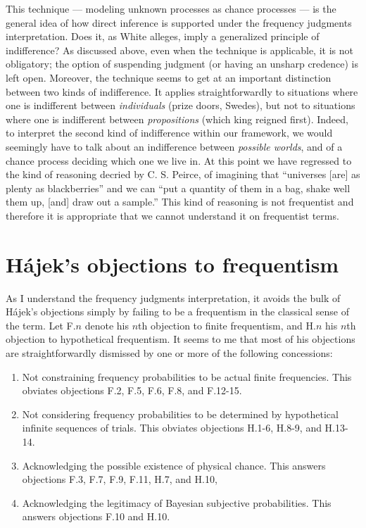 \documentclass[letterpaper,12pt]{article}
\newcommand{\hajek}{H\'ajek}
\begin{document}
This technique --- modeling unknown processes as chance processes --- is the general idea of how direct inference is supported under the frequency judgments interpretation. Does it, as White alleges, imply a generalized principle of indifference? As discussed above, even when the technique is applicable, it is not obligatory; the option of suspending judgment (or having an unsharp credence) is left open. Moreover, the technique seems to get at an important distinction between two kinds of indifference. It applies straightforwardly to situations where one is indifferent between \emph{individuals} (prize doors, Swedes), but not to situations where one is indifferent between \emph{propositions} (which king reigned first). Indeed, to interpret the second kind of indifference within our framework, we would seemingly have to talk about an indifference between \emph{possible worlds}, and of a chance process deciding which one we live in. At this point we have regressed to the kind of reasoning decried by C. S. Peirce, of imagining that ``universes [are] as plenty as blackberries'' and we can ``put a quantity of them in a bag, shake well them up, [and] draw out a sample.'' This kind of reasoning is not frequentist and therefore it is appropriate that we cannot understand it on frequentist terms.

\section{\hajek's objections to frequentism}
As I understand the frequency judgments interpretation, it avoids the bulk of \hajek's objections simply by failing to be a frequentism in the classical sense of the term. Let F.$n$ denote his $n$th objection to finite frequentism, and H.$n$ his $n$th objection to hypothetical frequentism. It seems to me that most of his objections are straightforwardly dismissed by one or more of the following concessions:
\begin{enumerate}
\item
Not constraining frequency probabilities to be actual finite frequencies. This obviates objections F.2, F.5, F.6, F.8, and F.12-15.
\item
Not considering frequency probabilities to be determined by hypothetical infinite sequences of trials. This obviates objections H.1-6, H.8-9, and H.13-14.
\item
Acknowledging the possible existence of physical chance. This answers objections F.3, F.7, F.9, F.11, H.7, and H.10,
\item
Acknowledging the legitimacy of Bayesian subjective probabilities. This answers objections F.10 and H.10.
\end{enumerate}
\end{document}
